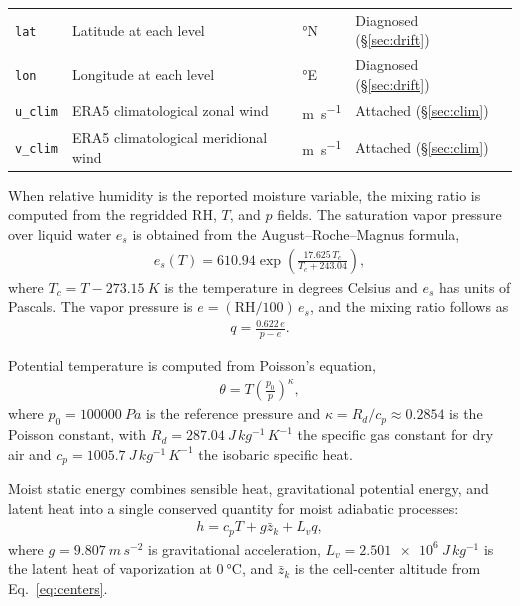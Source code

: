 \documentclass[11pt]{article}
\begin{document}
\begin{table}[h]
\begin{tabular}{lllll}
\texttt{lat}                & Latitude at each level             & \si{\degree}N   & Diagnosed (\S\ref{sec:drift}) \\
\texttt{lon}                & Longitude at each level            & \si{\degree}E   & Diagnosed (\S\ref{sec:drift}) \\
\texttt{u\_clim}            & ERA5 climatological zonal wind     & \si{m\per s}    & Attached (\S\ref{sec:clim}) \\
\texttt{v\_clim}            & ERA5 climatological meridional wind & \si{m\per s}   & Attached (\S\ref{sec:clim}) \\
\bottomrule
\end{tabular}
\end{table}

When relative humidity is the reported moisture variable, the mixing ratio is computed from the regridded $\mathrm{RH}$, $T$, and $p$ fields.  The saturation vapor pressure over liquid water $e_s$ is obtained from the August--Roche--Magnus formula,
\begin{align}
    e_s(T) = 610.94 \exp\!\left(\frac{17.625\, T_c}{T_c + 243.04}\right), \label{eq:es}
\end{align}
where $T_c = T - \SI{273.15}{K}$ is the temperature in degrees Celsius and $e_s$ has units of Pascals.  The vapor pressure is $e = (\mathrm{RH}/100)\, e_s$, and the mixing ratio follows as
\begin{align}
    q = \frac{0.622\, e}{p - e}. \label{eq:q}
\end{align}


Potential temperature is computed from Poisson's equation,
\begin{align}
    \theta = T \left(\frac{p_0}{p}\right)^{\kappa}, \label{eq:theta}
\end{align}
where $p_0 = \SI{100000}{Pa}$ is the reference pressure and $\kappa = R_d / c_p \approx 0.2854$ is the Poisson constant, with $R_d = \SI{287.04}{J\,kg^{-1}\,K^{-1}}$ the specific gas constant for dry air and $c_p = \SI{1005.7}{J\,kg^{-1}\,K^{-1}}$ the isobaric specific heat.


Moist static energy combines sensible heat, gravitational potential energy, and latent heat into a single conserved quantity for moist adiabatic processes:
\begin{align}
    h = c_p T + g\bar{z}_k + L_v q, \label{eq:MSE}
\end{align}
where $g = \SI{9.807}{m\,s^{-2}}$ is gravitational acceleration, $L_v = \SI{2.501e6}{J\,kg^{-1}}$ is the latent heat of vaporization at $\SI{0}{\celsius}$, and $\bar{z}_k$ is the cell-center altitude from Eq.~\ref{eq:centers}.
\end{document}
